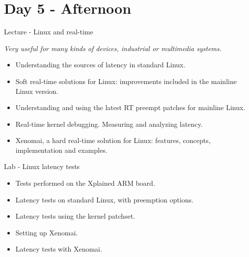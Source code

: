 \documentclass[a4paper,12pt,obeyspaces,spaces,hyphens]{article}
\begin{document}
\section{Day 5 - Afternoon}

\feagendaonecolumn
{Lecture - Linux and real-time}
{
  {\em Very useful for many kinds of devices, industrial or multimedia systems.}
  \begin{itemize}
  \item Understanding the sources of latency in standard Linux.
  \item Soft real-time solutions for Linux: improvements included
        in the mainline Linux version.
  \item Understanding and using the latest RT preempt patches for
        mainline Linux.
  \item Real-time kernel debugging. Measuring and analyzing latency.
  \item Xenomai, a hard real-time solution for Linux: features, concepts,
        implementation and examples.
  \end{itemize}
}

\feagendaonecolumn
{Lab - Linux latency tests}
{
  \begin{itemize}
  \item Tests performed on the Xplained ARM board.
  \item Latency tests on standard Linux, with preemption options.
  \item Latency tests using the  kernel patchset.
  \item Setting up Xenomai.
  \item Latency tests with Xenomai.
  \end{itemize}
}
\end{document}
